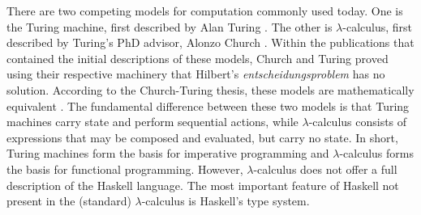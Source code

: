 \documentclass[MS, xcolor=dvipsnames]{wfuthesis}
\theoremstyle{definition}
\begin{document}
There are two competing models for computation commonly used today. One is the Turing machine, first described by Alan Turing \cite{Turing1937}. The other is $\lambda$-calculus, first described by Turing's PhD advisor, Alonzo Church \cite{Church1936}. Within the publications that contained the initial descriptions of these models, Church and Turing proved using their respective machinery that Hilbert's \emph{entscheidungsproblem} has no solution. According to the Church-Turing thesis, these models are mathematically equivalent \cite{Kleene1952}. The fundamental difference between these two models is that Turing machines carry state and perform sequential actions, while $\lambda$-calculus consists of expressions that may be composed and evaluated, but carry no state. In short, Turing machines form the basis for imperative programming and $\lambda$-calculus forms the basis for functional programming. However, $\lambda$-calculus does not offer a full description of the Haskell language. The most important feature of Haskell not present in the (standard) $\lambda$-calculus is Haskell's type system. 
\end{document}
